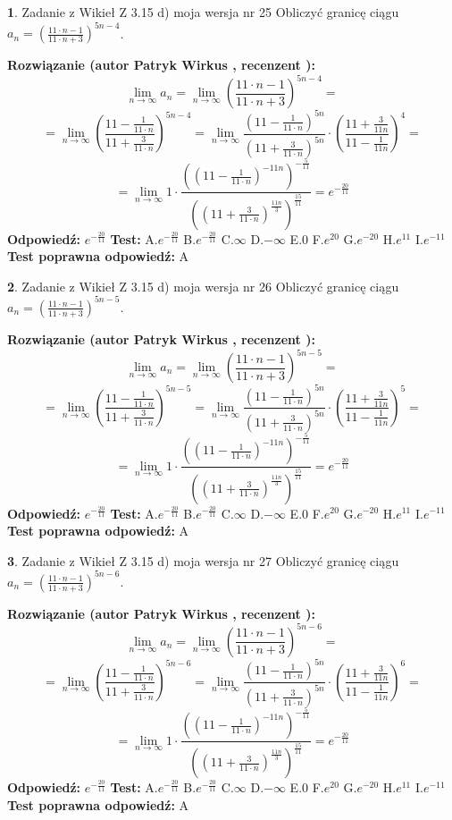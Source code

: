 \documentclass[12pt, a4paper]{article}
\theoremstyle{definition} %
\newtheorem{zad}{}
\newcommand{\zadStart}[1]{\begin{zad}#1\newline}
\newcommand{\zadStop}{\end{zad}}
\newcommand{\rozwStart}[2]{\noindent \textbf{Rozwiązanie (autor #1 , recenzent #2): }\newline}
\newcommand{\rozwStop}{\newline}
\newcommand{\odpStart}{\noindent \textbf{Odpowiedź:}\newline}
\newcommand{\odpStop}{\newline}
\newcommand{\testStart}{\noindent \textbf{Test:}\newline}
\newcommand{\testStop}{\newline}
\newcommand{\kluczStart}{\noindent \textbf{Test poprawna odpowiedź:}\newline}
\newcommand{\kluczStop}{\newline}
\begin{document}
\zadStart{Zadanie z Wikieł Z 3.15 d) moja wersja nr 25}
Obliczyć granicę ciągu $a_{n}=(\frac{11\cdot n - 1}{11 \cdot n + 3})^{5n-4}$.
\zadStop
\rozwStart{Patryk Wirkus}{}
$$\lim\limits_{n\to\infty} a_{n} = \lim\limits_{n\to\infty}(\frac{11\cdot n - 1}{11 \cdot n + 3})^{5n-4}=$$
$$=\lim\limits_{n\to\infty}(\frac{11 - \frac{1}{11\cdot n}}{11 + \frac{3}{11 \cdot n}})^{5n-4}=\lim\limits_{n\to\infty}\frac{(11 - \frac{1}{11\cdot n})^{5n}}{(11 + \frac{3}{11\cdot n})^{5n}} \cdot (\frac{11+\frac{3}{11n}}{11-\frac{1}{11n}})^{4}=$$
$$=\lim\limits_{n\to\infty} 1 \cdot \frac{((11-\frac{1}{11 \cdot n})^{-11n})^{-\frac{5}{11}}}{((11+\frac{3}{11 \cdot n})^{\frac{11n}{3}})^{\frac{15}{11}}} =e^{-\frac{20}{11}}$$
\rozwStop
\odpStart
$e^{-\frac{20}{11}}$
\odpStop
\testStart
A.$ e^{-\frac{20}{11}}$
B.$ e^{-\frac{20}{11}}$
C.$\infty$
D.$-\infty$
E.$0$
F.$e^{20}$
G.$e^{-20}$
H.$e^{11}$
I.$e^{-11}$
\testStop
\kluczStart
A
\kluczStop



\zadStart{Zadanie z Wikieł Z 3.15 d) moja wersja nr 26}
Obliczyć granicę ciągu $a_{n}=(\frac{11\cdot n - 1}{11 \cdot n + 3})^{5n-5}$.
\zadStop
\rozwStart{Patryk Wirkus}{}
$$\lim\limits_{n\to\infty} a_{n} = \lim\limits_{n\to\infty}(\frac{11\cdot n - 1}{11 \cdot n + 3})^{5n-5}=$$
$$=\lim\limits_{n\to\infty}(\frac{11 - \frac{1}{11\cdot n}}{11 + \frac{3}{11 \cdot n}})^{5n-5}=\lim\limits_{n\to\infty}\frac{(11 - \frac{1}{11\cdot n})^{5n}}{(11 + \frac{3}{11\cdot n})^{5n}} \cdot (\frac{11+\frac{3}{11n}}{11-\frac{1}{11n}})^{5}=$$
$$=\lim\limits_{n\to\infty} 1 \cdot \frac{((11-\frac{1}{11 \cdot n})^{-11n})^{-\frac{5}{11}}}{((11+\frac{3}{11 \cdot n})^{\frac{11n}{3}})^{\frac{15}{11}}} =e^{-\frac{20}{11}}$$
\rozwStop
\odpStart
$e^{-\frac{20}{11}}$
\odpStop
\testStart
A.$ e^{-\frac{20}{11}}$
B.$ e^{-\frac{20}{11}}$
C.$\infty$
D.$-\infty$
E.$0$
F.$e^{20}$
G.$e^{-20}$
H.$e^{11}$
I.$e^{-11}$
\testStop
\kluczStart
A
\kluczStop



\zadStart{Zadanie z Wikieł Z 3.15 d) moja wersja nr 27}
Obliczyć granicę ciągu $a_{n}=(\frac{11\cdot n - 1}{11 \cdot n + 3})^{5n-6}$.
\zadStop
\rozwStart{Patryk Wirkus}{}
$$\lim\limits_{n\to\infty} a_{n} = \lim\limits_{n\to\infty}(\frac{11\cdot n - 1}{11 \cdot n + 3})^{5n-6}=$$
$$=\lim\limits_{n\to\infty}(\frac{11 - \frac{1}{11\cdot n}}{11 + \frac{3}{11 \cdot n}})^{5n-6}=\lim\limits_{n\to\infty}\frac{(11 - \frac{1}{11\cdot n})^{5n}}{(11 + \frac{3}{11\cdot n})^{5n}} \cdot (\frac{11+\frac{3}{11n}}{11-\frac{1}{11n}})^{6}=$$
$$=\lim\limits_{n\to\infty} 1 \cdot \frac{((11-\frac{1}{11 \cdot n})^{-11n})^{-\frac{5}{11}}}{((11+\frac{3}{11 \cdot n})^{\frac{11n}{3}})^{\frac{15}{11}}} =e^{-\frac{20}{11}}$$
\rozwStop
\odpStart
$e^{-\frac{20}{11}}$
\odpStop
\testStart
A.$ e^{-\frac{20}{11}}$
B.$ e^{-\frac{20}{11}}$
C.$\infty$
D.$-\infty$
E.$0$
F.$e^{20}$
G.$e^{-20}$
H.$e^{11}$
I.$e^{-11}$
\testStop
\kluczStart
A
\kluczStop
\end{document}
